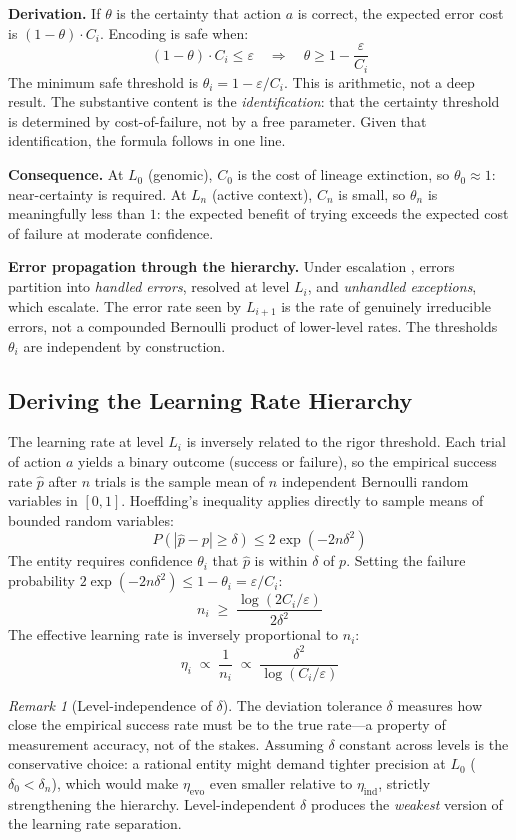 \documentclass[11pt]{article}
\theoremstyle{definition}
\theoremstyle{remark}
\newtheorem{remark}{Remark}
\begin{document}
\textbf{Derivation.}
If $\theta$ is the certainty that action $a$ is correct, the expected
error cost is $(1 - \theta) \cdot C_i$. Encoding is safe when:
\[
(1 - \theta) \cdot C_i \leq \varepsilon
\quad\Longrightarrow\quad
\theta \geq 1 - \frac{\varepsilon}{C_i}
\]
The minimum safe threshold is $\theta_i = 1 - \varepsilon / C_i$.
This is arithmetic, not a deep result. The substantive content is the
\emph{identification}: that the certainty threshold is determined by
cost-of-failure, not by a free parameter. Given that identification,
the formula follows in one line.

\textbf{Consequence.} At $L_0$ (genomic), $C_0$ is the cost of lineage
extinction, so $\theta_0 \approx 1$: near-certainty is required.
At $L_n$ (active context), $C_n$ is small, so $\theta_n$ is
meaningfully less than $1$: the expected benefit of trying exceeds the
expected cost of failure at moderate confidence.

\textbf{Error propagation through the hierarchy.} Under escalation
\cite{McCarthy2026b}, errors partition into \emph{handled errors},
resolved at level $L_i$, and \emph{unhandled exceptions}, which
escalate. The error rate seen by $L_{i+1}$ is the rate of genuinely
irreducible errors, not a compounded Bernoulli product of lower-level
rates. The thresholds $\theta_i$ are independent by construction.

\subsection{Deriving the Learning Rate Hierarchy}

The learning rate at level $L_i$ is inversely related to the rigor
threshold. Each trial of action $a$ yields a binary outcome (success or
failure), so the empirical success rate $\hat{p}$ after $n$ trials is
the sample mean of $n$ independent Bernoulli random variables in
$[0,1]$. Hoeffding's inequality \cite{Hoeffding1963} applies directly
to sample means of bounded random variables:
\[
P(|\hat{p} - p| \geq \delta) \leq 2\exp(-2n\delta^2)
\]
The entity requires confidence $\theta_i$ that $\hat{p}$ is within
$\delta$ of $p$. Setting the failure probability
$2\exp(-2n\delta^2) \leq 1 - \theta_i = \varepsilon / C_i$:
\[
n_i \;\geq\; \frac{\log(2 C_i / \varepsilon)}{2\delta^2}
\]
The effective learning rate is inversely proportional to $n_i$:
\[
\eta_i \;\propto\; \frac{1}{n_i}
\;\propto\; \frac{\delta^2}{\log(C_i / \varepsilon)}
\]

\begin{remark}[Level-independence of $\delta$]
\label{rem:delta}
The deviation tolerance $\delta$ measures how close the empirical
success rate must be to the true rate---a property of measurement
accuracy, not of the stakes. Assuming $\delta$ constant across levels is
the conservative choice: a rational entity might demand tighter
precision at $L_0$ ($\delta_0 < \delta_n$), which would make
$\eta_{\mathrm{evo}}$ even smaller relative to $\eta_{\mathrm{ind}}$,
strictly strengthening the hierarchy. Level-independent $\delta$
produces the \emph{weakest} version of the learning rate separation.
\end{remark}
\end{document}
